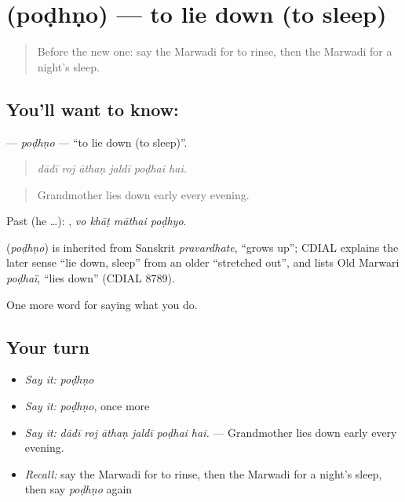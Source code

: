 \section[\texorpdfstring{\mw{पोढणो} (poḍhṇo)}{पोढणो (poḍhṇo)}]{ (poḍhṇo) — to lie down (to sleep)}

\label{lesson:MW-C166-podhno}



\begin{quote}
Before the new one: say the Marwadi for to rinse, then the Marwadi for a night's sleep.
\end{quote}

\subsection*{You'll want to know: }
\textbf{} — \emph{poḍhṇo} — \textquotedblleft{}to lie down (to sleep)\textquotedblright{}.

\begin{quote}
     
\end{quote}

\begin{quote}
\emph{dādī roj āthaṇ jaldī poḍhai hai.}
\end{quote}

\begin{quote}
Grandmother lies down early every evening.
\end{quote}

Past (he …):    , \emph{vo khāṭ māthai poḍhyo}.

\begin{cousinweb}
\textbf{} (\emph{poḍhṇo}) is inherited from Sanskrit \emph{pravardhate}, \textquotedblleft{}grows up\textquotedblright{}; CDIAL explains the later sense \textquotedblleft{}lie down, sleep\textquotedblright{} from an older \textquotedblleft{}stretched out\textquotedblright{}, and lists Old Marwari \emph{poḍhaï}, \textquotedblleft{}lies down\textquotedblright{} (CDIAL 8789).
\end{cousinweb}

\begin{grammarlens}[title={What you've built}]
One more word for saying what you do.
\end{grammarlens}

\subsection*{Your turn}
\begin{itemize}
\raggedright
  \item \emph{Say it:} \emph{poḍhṇo}
  \item \emph{Say it:} \emph{poḍhṇo}, once more
  \item \emph{Say it:} \emph{dādī roj āthaṇ jaldī poḍhai hai.} — Grandmother lies down early every evening.
  \item \emph{Recall:} say the Marwadi for to rinse, then the Marwadi for a night's sleep, then say \emph{poḍhṇo} again
\end{itemize}

